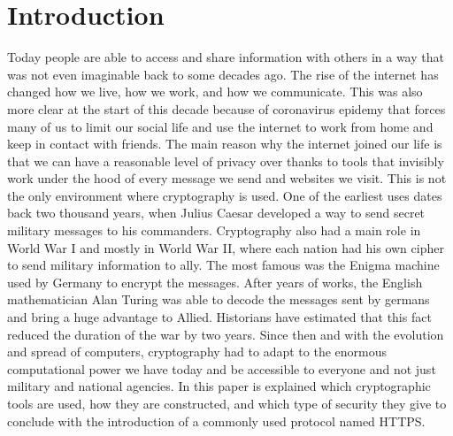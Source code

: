 \chapter{Introduction}\label{chap:introduction}
\par
Today people are able to access and share information with others in a way that was not even imaginable back to some decades ago. The rise of the internet has changed how we live, how we work, and how we communicate. This was also more clear at the start of this decade because of coronavirus epidemy that forces many of us to limit our social life and use the internet to work from home and keep in contact with friends. The main reason why the internet joined our life is that we can have a reasonable level of privacy over thanks to tools that invisibly work under the hood of every message we send and websites we visit. This is not the only environment where cryptography is used. One of the earliest uses dates back two thousand years, when Julius Caesar developed a way to send secret military messages to his commanders. Cryptography also had a main role in World War I and mostly in World War II, where each nation had his own cipher to send military information to ally. The most famous was the Enigma machine used by Germany to encrypt the messages. After years of works, the English mathematician Alan Turing was able to decode the messages sent by germans and bring a huge advantage to Allied. Historians have estimated that this fact reduced the duration of the war by two years. Since then and with the evolution and spread of computers, cryptography had to adapt to the enormous computational power we have today and be accessible to everyone and not just military and national agencies. In this paper is explained which cryptographic tools are used, how they are constructed, and which type of security they give to conclude with the introduction of a commonly used protocol named HTTPS.

